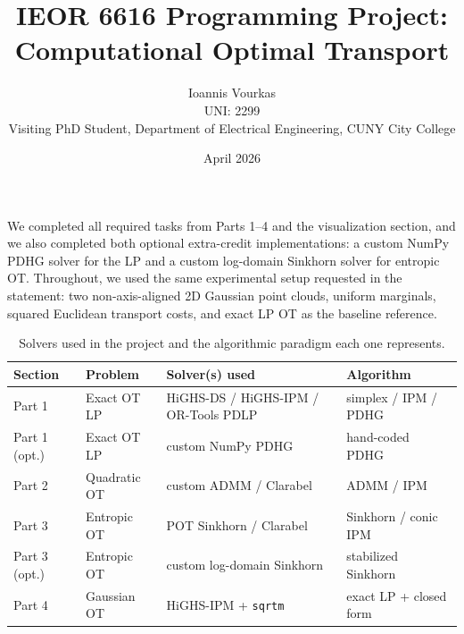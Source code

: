 \documentclass[10pt]{article}
\title{\vspace{-1em}IEOR 6616 Programming Project: Computational Optimal Transport}
\author{Ioannis Vourkas\\
UNI: 2299\\
Visiting PhD Student, Department of Electrical Engineering, CUNY City College}
\date{April 2026}
\begin{document}
\maketitle

We completed all required tasks from Parts 1--4 and the visualization section, and we also completed both optional extra-credit implementations: a custom NumPy PDHG solver for the LP and a custom log-domain Sinkhorn solver for entropic OT. Throughout, we used the same experimental setup requested in the statement: two non-axis-aligned 2D Gaussian point clouds, uniform marginals, squared Euclidean transport costs, and exact LP OT as the baseline reference.

\begin{table}[H]
\centering
\small
\begin{tabular}{llll}
\toprule
Section & Problem & Solver(s) used & Algorithm \\
\midrule
Part 1 & Exact OT LP & HiGHS-DS / HiGHS-IPM / OR-Tools PDLP & simplex / IPM / PDHG \\
Part 1 (opt.) & Exact OT LP & custom NumPy PDHG & hand-coded PDHG \\
Part 2 & Quadratic OT & custom ADMM / Clarabel & ADMM / IPM \\
Part 3 & Entropic OT & POT Sinkhorn / Clarabel & Sinkhorn / conic IPM \\
Part 3 (opt.) & Entropic OT & custom log-domain Sinkhorn & stabilized Sinkhorn \\
Part 4 & Gaussian OT & HiGHS-IPM + \texttt{sqrtm} & exact LP + closed form \\
\bottomrule
\end{tabular}
\caption{Solvers used in the project and the algorithmic paradigm each one represents.}
\label{tab:solvers}
\end{table}
\end{document}
